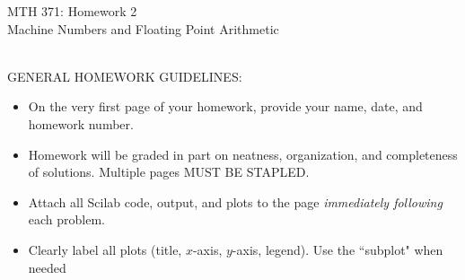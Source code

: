 \documentclass[addpoints, 11pt]{exam}
\begin{document}
\vspace{100mm}
\begin{center} \Large
MTH 371: Homework 2 \\ Machine Numbers and Floating Point Arithmetic\normalsize
\end{center}
\ \\
\noindent GENERAL HOMEWORK GUIDELINES: 
\begin{itemize}
\item On the very first page of your homework, provide your name, date, and homework number.\vspace{-2mm}
\item Homework will be graded in part on neatness, organization, and completeness of solutions. Multiple pages MUST BE STAPLED. \vspace{-2mm}
\item Attach all Scilab code, output, and plots to the page \emph{immediately following} each problem. \vspace{-2mm}
\item Clearly label all plots (title, $x$-axis, $y$-axis, legend). Use the ``subplot" when needed
\end{itemize}
\end{document}
